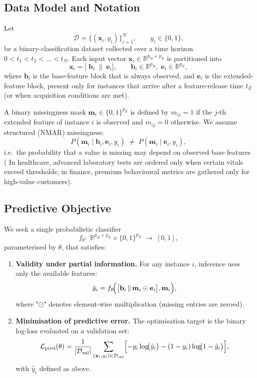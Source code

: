 \documentclass[sigconf]{acmart}
\begin{document}
\begin{itemize}
\subsection{Data Model and Notation}

Let
\[
\mathcal D=\{(\mathbf{x}_i,y_i)\}_{i=1}^{N},
\qquad
y_i\in\{0,1\},
\]
be a binary-classification dataset collected over a time horizon
\(0<t_1<t_2<\dots<t_N\).
Each input vector \(\mathbf{x}_i\in\mathbb R^{p_B+p_E}\) is partitioned into
\[
\mathbf{x}_i=\bigl[\;\mathbf{b}_i\;\|\;\mathbf{e}_i\bigr],
\qquad
\mathbf{b}_i\in\mathbb R^{p_B},\;
\mathbf{e}_i\in\mathbb R^{p_E},
\]
where \(\mathbf{b}_i\) is the base-feature block that is always observed, and
\(\mathbf{e}_i\) is the extended-feature block, present only for instances that arrive
after a feature-release time \(t_E\) (or when acquisition conditions are met).

A binary missingness mask
\(\mathbf{m}_i\in\{0,1\}^{p_E}\) is defined by
\(m_{ij}=1\) if the \(j\)-th extended feature of instance \(i\) is observed and
\(m_{ij}=0\) otherwise.
We assume structured (NMAR) missingness:
\[
P(\mathbf{m}_i \mid \mathbf{b}_i,\mathbf{e}_i,y_i)
\;\neq\;
P(\mathbf{m}_i \mid \mathbf{e}_i,y_i),
\]
i.e.\ the probability that a value is missing may depend on observed base features (
In healthcare, advanced laboratory tests are ordered only when certain vitals exceed thresholds; in finance, premium behavioural metrics are gathered only for high-value customers).

\subsection{Predictive Objective}

We seek a single probabilistic classifier
\[
f_\theta:\;
  \mathbb R^{p_B+p_E}\times\{0,1\}^{p_E}
  \;\longrightarrow\;[0,1],
\]
parameterised by \(\theta\), that satisfies:

\begin{enumerate}[label=(\alph*)]
\item \textbf{Validity under partial information.}\;
For any instance \(i\), inference uses only the available features:
\[
\hat y_i
  = f_\theta\!\Bigl(
      \bigl[\mathbf{b}_i \,\|\, \mathbf{m}_i\odot\mathbf{e}_i\bigr],
      \mathbf{m}_i
    \Bigr),
\]
where "\(\odot\)" denotes element-wise multiplication (missing entries are zeroed).

\item \textbf{Minimisation of predictive error.}\;
The optimisation target is the binary log-loss evaluated on a validation set:
\[
\mathcal L_{\mathrm{pred}}(\theta)=
\frac{1}{|\mathcal D_{\mathrm{val}}|}
\sum_{(\mathbf{x}_i,y_i)\in\mathcal D_{\mathrm{val}}}
\Bigl[
  -y_i\log\!\bigl(\hat y_i\bigr)
  -(1-y_i)\log\!\bigl(1-\hat y_i\bigr)
\Bigr],
\]
with \(\hat y_i\) defined as above.
\end{enumerate}


\end{itemize}
\end{document}
